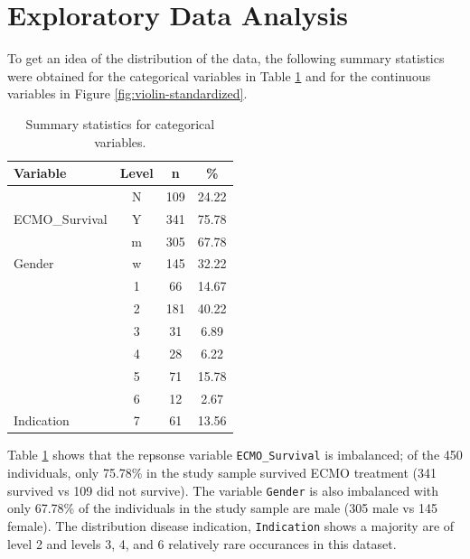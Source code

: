 \documentclass[12pt,]{article}
\begin{document}
\newpage

\section{Exploratory Data Analysis}\label{exploratory-data-analysis}

To get an idea of the distribution of the data, the following summary
statistics were obtained for the categorical variables in Table
\ref{tab:categorical-summaries} and for the continuous variables in
Figure \ref{fig:violin-standardized}.

\begin{table}[!h]

\caption{\label{tab:unnamed-chunk-3}\label{tab:categorical-summaries} Summary statistics for categorical variables.}
\centering
\fontsize{10}{12}\selectfont
\begin{tabular}{lccc}
\toprule
Variable & Level & n & \%\\
\midrule
 & N & 109 & 24.22\\

\multirow{-2}{*}{\raggedright\arraybackslash ECMO\_Survival} & Y & 341 & 75.78\\
\cmidrule{1-4}
 & m & 305 & 67.78\\

\multirow{-2}{*}{\raggedright\arraybackslash Gender} & w & 145 & 32.22\\
\cmidrule{1-4}
 & 1 & 66 & 14.67\\

 & 2 & 181 & 40.22\\

 & 3 & 31 & 6.89\\

 & 4 & 28 & 6.22\\

 & 5 & 71 & 15.78\\

 & 6 & 12 & 2.67\\

\multirow{-7}{*}{\raggedright\arraybackslash Indication} & 7 & 61 & 13.56\\
\bottomrule
\end{tabular}
\end{table}

Table \ref{tab:categorical-summaries} shows that the repsonse variable
\texttt{ECMO\_Survival} is imbalanced; of the 450 individuals, only
75.78\% in the study sample survived ECMO treatment (341 survived vs 109
did not survive). The variable \texttt{Gender} is also imbalanced with
only 67.78\% of the individuals in the study sample are male (305 male
vs 145 female). The distribution disease indication, \texttt{Indication}
shows a majority are of level 2 and levels 3, 4, and 6 relatively rare
occurances in this dataset.
\end{document}
